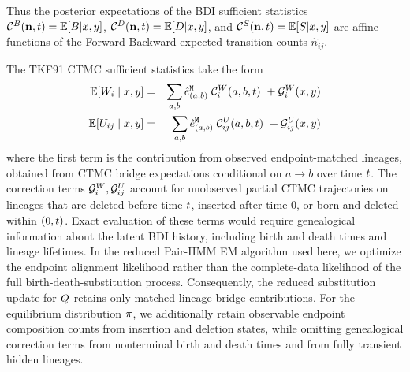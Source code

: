 Thus the posterior expectations of the BDI sufficient statistics
$\mathcal{C}^B({\bf n},t) = \mathbb{E}[B|x,y]$, $\mathcal{C}^D({\bf n},t) = \mathbb{E}[D|x,y]$, and $\mathcal{C}^S({\bf n},t) = \mathbb{E}[S|x,y]$
are affine functions of the Forward-Backward expected transition counts $\hat n_{ij}$.

The TKF91 CTMC sufficient statistics take the form
\begin{eqnarray*}
\mathbb{E}[W_i \mid x,y] & = & \sum_{a,b} \hat{e}^{\tt M}_{(a,b)}\; \mathcal{C}^W_i(a,b,t)\ + \mathcal{G}^W_i (x,y) \\
\mathbb{E}[U_{ij} \mid x,y] & = & \sum_{a,b} \hat{e}^{\tt M}_{(a,b)}\; \mathcal{C}^U_{ij}(a,b,t)\ + \mathcal{G}^U_{ij} (x,y) \\
\end{eqnarray*}
where the first term is the contribution from observed endpoint-matched lineages, obtained from CTMC bridge expectations conditional on
$a \to b$ over time $t$.
The correction terms $\mathcal{G}^W_i, \mathcal{G}^U_{ij}$ account for unobserved partial CTMC trajectories on lineages that are deleted before time $t$,
inserted after time 0, or born and deleted within $(0,t)$.
Exact evaluation of these terms would require genealogical information about the latent BDI history, including birth and death times and lineage lifetimes.
In the reduced Pair-HMM EM algorithm used here, we optimize the endpoint alignment likelihood rather than the complete-data likelihood of the full birth-death-substitution process.
Consequently, the reduced substitution update for $Q$ retains only matched-lineage bridge contributions. For the equilibrium distribution $\pi$,
we additionally retain observable endpoint composition counts from insertion and deletion states, while omitting genealogical correction terms from nonterminal birth and death times and from fully transient hidden lineages.

